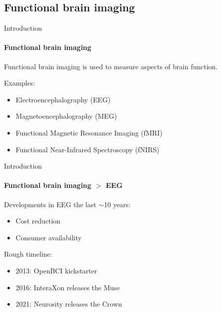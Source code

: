 \documentclass[xcolor={dvipsnames,table},12pt]{beamer}
\begin{document}
\subsection{Functional brain imaging}
\begin{frame}{Introduction}
    \framesubtitle{Functional brain imaging}

    Functional brain imaging is used to measure aspects of brain function.

    Examples:
    \begin{itemize}
        \item Electroencephalography (EEG)
        \item Magnetoencephalography (MEG)
        \item Functional Magnetic Resonance Imaging (fMRI)
        \item Functional Near-Infrared Spectroscopy (fNIRS)
    \end{itemize}
\end{frame}

\begin{frame}{Introduction}
    \framesubtitle{Functional brain imaging $>$ EEG}

    Developments in EEG the last $\sim$10 years:

    \begin{itemize}
        \item Cost reduction
        \item Consumer availability
    \end{itemize}

    Rough timeline:

    \begin{itemize}
        \item 2013: OpenBCI kickstarter
        \item 2016: InteraXon releases the Muse
        \item 2021: Neurosity releases the Crown
    \end{itemize}
\end{frame}
\end{document}
